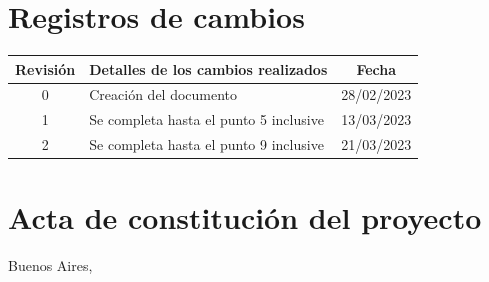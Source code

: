 \documentclass[
11pt, %
]{charter}
\begin{document}
\maketitle
\thispagestyle{empty}
\pagebreak


\thispagestyle{empty}
{\setlength{\parskip}{0pt}
\tableofcontents{}
}
\pagebreak


\section*{Registros de cambios}
\label{sec:registro}


\begin{table}[ht]
\label{tab:registro}
\centering
\begin{tabularx}{\linewidth}{@{}|c|X|c|@{}}
\hline
\rowcolor[HTML]{C0C0C0} 
Revisión & \multicolumn{1}{c|}{\cellcolor[HTML]{C0C0C0}Detalles de los cambios realizados} & Fecha      \\ \hline
0      & Creación del documento                                 & 28/02/2023 \\ \hline
1      & Se completa hasta el punto 5 inclusive                 & 13/03/2023 \\ \hline
2      & Se completa hasta el punto 9 inclusive 				& 21/03/2023 \\ \hline
\end{tabularx}
\end{table}

\pagebreak



\section*{Acta de constitución del proyecto}
\label{sec:acta}

\begin{flushright}
Buenos Aires, \fechaInicioName
\end{flushright}

\vspace{2cm}
\end{document}
